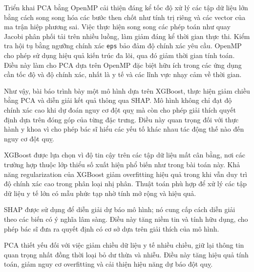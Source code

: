 Triển khai PCA bằng OpenMP cải thiện đáng kể tốc độ xử lý các tập dữ liệu lớn bằng cách song song hóa các bước then chốt như tính trị riêng và các vector của ma trận hiệp phương sai. Việc thực hiện song song các phép toán như quay Jacobi phân phối tải trên nhiều luồng, làm giảm đáng kể thời gian thực thi. Kiểm tra hội tụ bằng ngưỡng chính xác \texttt{eps} bảo đảm độ chính xác yêu cầu. OpenMP cho phép sử dụng hiệu quả kiến trúc đa lõi, qua đó giảm thời gian tính toán. Điều này làm cho PCA dựa trên OpenMP đặc biệt hữu ích trong các ứng dụng cần tốc độ và độ chính xác, nhất là y tế và các lĩnh vực nhạy cảm về thời gian.

Như vậy, bài báo trình bày một mô hình dựa trên XGBoost, thực hiện giảm chiều bằng PCA và diễn giải kết quả thông qua SHAP. Mô hình không chỉ đạt độ chính xác cao khi dự đoán nguy cơ đột quỵ mà còn cho phép giải thích quyết định dựa trên đóng góp của từng đặc trưng. Điều này quan trọng đối với thực hành y khoa vì cho phép bác sĩ hiểu các yếu tố khác nhau tác động thế nào đến nguy cơ đột quỵ.

XGBoost được lựa chọn vì độ tin cậy trên các tập dữ liệu mất cân bằng, nơi các trường hợp thuộc lớp thiểu số xuất hiện phổ biến như trong bài toán này. Khả năng regularization của XGBoost giảm overfitting hiệu quả trong khi vẫn duy trì độ chính xác cao trong phân loại nhị phân. Thuật toán phù hợp để xử lý các tập dữ liệu y tế lớn có mẫu phức tạp nhờ tính mở rộng và hiệu quả.

SHAP được sử dụng để diễn giải dự báo mô hình; nó cung cấp cách diễn giải theo các biến có ý nghĩa lâm sàng. Điều này tăng niềm tin và tính hữu dụng, cho phép bác sĩ đưa ra quyết định có cơ sở dựa trên giải thích của mô hình.

PCA thiết yếu đối với việc giảm chiều dữ liệu y tế nhiều chiều, giữ lại thông tin quan trọng nhất đồng thời loại bỏ dư thừa và nhiễu. Điều này tăng hiệu quả tính toán, giảm nguy cơ overfitting và cải thiện hiệu năng dự báo đột quỵ.
